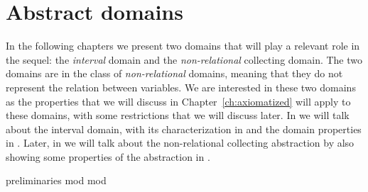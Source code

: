 \chapter{Abstract domains}\label{ch:abstractdomains}


In the following chapters we present two domains that will play a
relevant role in the sequel: the \emph{interval} domain and the
\emph{non-relational} collecting domain. The two domains are in the
class of \emph{non-relational} domains, meaning that they do not
represent the relation between variables. We are interested in these
two domains as the properties that we will discuss in
Chapter~\ref{ch:axiomatized} will apply to these domains, with some
restrictions that we will discuss later. In  we
will talk about the interval domain, with its characterization in
 and the domain properties in
.  Later, in  we
will talk about the non-relational collecting abstraction by also
showing some properties of the abstraction in .

{preliminaries}
{mod}
{mod}

